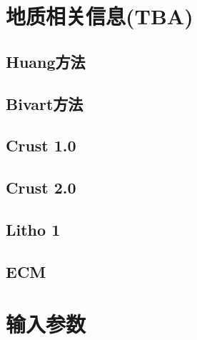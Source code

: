 	\chapter{地质相关信息(TBA)}
		\section{Huang方法}
		\label{Geology: Huang Method}
		\section{Bivart方法}
		\label{Geology: Bivart Method}
		\section{Crust 1.0}
		\section{Crust 2.0}
		\section{Litho 1}
		\section{ECM}
		
	\chapter{输入参数}
